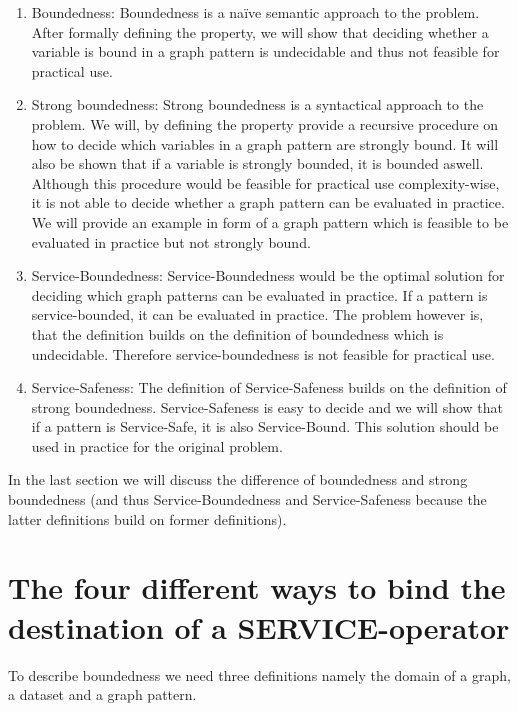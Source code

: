 \begin{enumerate}
	\item Boundedness: Boundedness is a na{\"i}ve semantic approach to the
		problem. After formally defining the property, we will show that
		deciding whether a variable is bound in a graph pattern
		is undecidable and thus not feasible for practical use.

	\item Strong boundedness: Strong boundedness is a syntactical approach to
		the problem. We will, by defining the property provide a recursive
		procedure on how to decide which variables in a graph pattern are
		strongly bound. It will also be shown that if a variable is strongly
		bounded, it is bounded aswell. 
		Although this procedure would be feasible for practical
		use complexity-wise, it is not able to decide whether a graph pattern
		can be evaluated in practice. We will provide an example in form of a
		graph pattern which is feasible to be evaluated in practice but not
		strongly bound.

	\item Service-Boundedness: Service-Boundedness would be the optimal solution for
		deciding which graph patterns can be evaluated in practice. If a pattern
		is service-bounded, it can be evaluated in practice. The problem however
		is, that the definition builds on the definition of boundedness which is
		undecidable. Therefore service-boundedness is not feasible for practical
		use.
	\item Service-Safeness: The definition of Service-Safeness builds on the
		definition of strong boundedness. 
		Service-Safeness is easy to decide and we will show that if a pattern is
		Service-Safe, it is also Service-Bound. This solution should be used in
		practice for the original problem.
\end{enumerate}

In the last section we will discuss the difference of boundedness and strong
boundedness (and thus Service-Boundedness and Service-Safeness because the
latter definitions build on former definitions). 

\section{The four different ways to bind the destination of a SERVICE-operator}

To describe boundedness we need three definitions namely the domain of a graph,
a dataset and a graph pattern.

